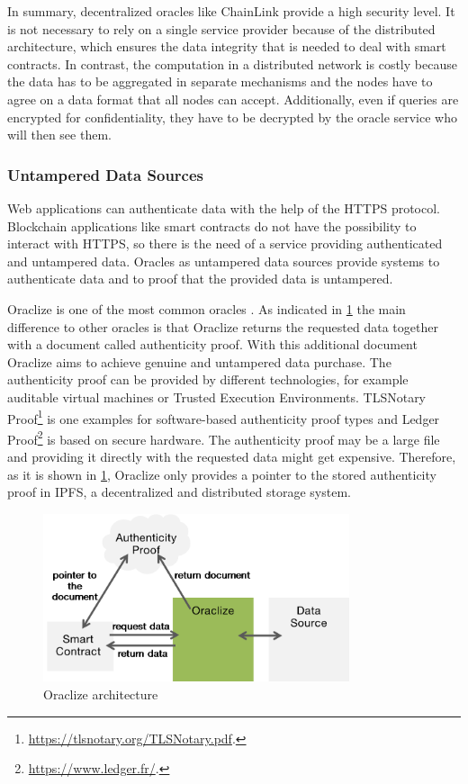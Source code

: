 \documentclass[conference]{IEEEtran}
\begin{document}
In summary, decentralized oracles like ChainLink provide a high security level. It is not necessary to rely on a single service provider because of the distributed architecture, which ensures the data integrity that is needed to deal with smart contracts. In contrast, the computation in a distributed network is costly because the data has to be aggregated in separate mechanisms and the nodes have to agree on a data format that all nodes can accept. Additionally, even if queries are encrypted for confidentiality, they have to be decrypted by the oracle service who will then see them. \cite{Ellis2017} \cite{Oraclize2017}
\subsubsection{Untampered Data Sources}
Web applications can authenticate data with the help of the HTTPS protocol. Blockchain applications like smart contracts do not have the possibility to interact with HTTPS, so there is the need of a service providing authenticated and untampered data. Oracles as untampered data sources provide systems to authenticate data and to proof that the provided data is untampered. \cite{Oraclize2017} \par 
Oraclize is one of the most common oracles \cite{Bartoletti2017}. As indicated in \ref{oraclize} the main difference to other oracles is that Oraclize returns the requested data together with a document called authenticity proof. With this additional document Oraclize aims to achieve genuine and untampered data purchase. The authenticity proof can be provided by different technologies, for example auditable virtual machines or Trusted Execution Environments. TLSNotary Proof\footnote{\url{https://tlsnotary.org/TLSNotary.pdf}.} is one examples for software-based authenticity proof types and Ledger Proof\footnote{\url{https://www.ledger.fr/}.} is based on secure hardware. The authenticity proof may be a large file and providing it directly with the requested data might get expensive. Therefore, as it is shown in \ref{oraclize}, Oraclize only provides a pointer to the stored authenticity proof in IPFS, a decentralized and distributed storage system. \cite{Oraclize2017} \par
\begin{figure}[h]
	\begin{center}
		\includegraphics[width=9cm]{Oraclize.png}
		\caption{Oraclize architecture}
		\label{oraclize}
	\end{center}
\end{figure}
\end{document}
